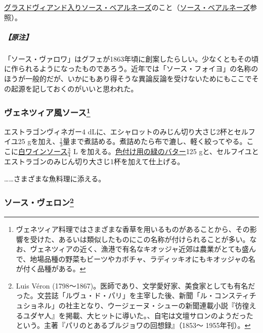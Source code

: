 \begin{recette}
\protect\hyperlink{sauce-bearnaise-a-la-glace-de-viande}{グラスドヴィアンド入りソース・ベアルネーズ}のこと（\protect\hyperlink{sauce-bearnaise}{ソース・ベアルネーズ}参照）。

\hypertarget{nota-sauce-valois}{%
\subparagraph{【原注】}\label{nota-sauce-valois}}

「ソース・ヴァロワ」はグフェが1863年頃に創案したらしい。少なくともその頃に作られるようになったものであろう。近年では「ソース・フォイヨ」の名称のほうが一般的だが、いかにもあり得そうな異論反論を受けないためにもここでその起源を記しておくのがいいと思われた。

\hypertarget{sauce-venitienne}{%
\subsubsection[ヴェネツィア風ソース]{\texorpdfstring{ヴェネツィア風ソース\footnote{ヴェネツィア料理ではさまざまな香草を用いるものがあることから、その影響を受けた、あるいは類似したものにこの名称が付けられることが多い。なお、ヴェネツィアの近く、漁港で有名なキオッジャ近郊は農業がとても盛んで、地場品種の野菜もビーツやカボチャ、ラディッキオにもキオッジャの名が付く品種がある。}}{ヴェネツィア風ソース}}\label{sauce-venitienne}}



エストラゴンヴィネガー4
dLに、エシャロットのみじん切り大さじ2杯とセルフイユ25
gを加え、\(\frac{1}{3}\)量まで煮詰める。煮詰めたら布で漉し、軽く絞ってやる。ここに\protect\hyperlink{sauce-vin-blanc}{白ワインソース}\(\frac{3}{4}\)
L
を加える。\protect\hyperlink{beurre-colorant-vert}{色付け用の緑のバター}125
gと、セルフイユとエストラゴンのみじん切り大さじ1杯を加えて仕上げる。

\ldots{}\ldots{}さまざまな魚料理に添える。

\hypertarget{sauce-veron}{%
\subsubsection[ソース・ヴェロン]{\texorpdfstring{ソース・ヴェロン\footnote{Luis
  Véron
  (1798〜1867)。医師であり、文学愛好家、美食家としても有名だった。文芸誌「ルヴュ・ド・パリ」を主宰した後、新聞「ル・コンスティチュショネル」の社主となり、ウージェーヌ・シューの新聞連載小説『彷徨えるユダヤ人』を掲載、大ヒットに導いた。、自宅は文壇サロンのようだったという。主著『パリのとあるブルジョワの回想録』（1853〜
  1955年刊）。}}{ソース・ヴェロン}}\label{sauce-veron}}


\end{recette}
